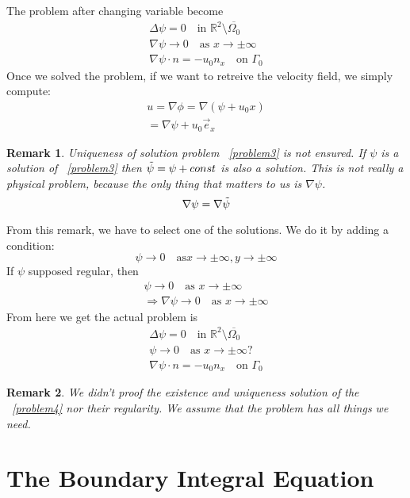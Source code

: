 \documentclass[a4paper,12pt]{article}
\newtheorem{remark}{Remark}
\begin{document}
The problem after changing variable become
\begin{align}  \label{problem3}
\Delta \psi=0 \quad \text{in } \mathbb{R}^2 \setminus \overline{\Omega_0}\\
\nabla\psi \to 0 \quad \text{as } x\to\pm\infty\\
\nabla\psi \cdot n = -u_0 n_x \quad \text{on } \Gamma_0 
\end{align}
Once we solved the problem, if we want to retreive the velocity field, we simply compute:
\begin{align}
 u=\nabla\phi=\nabla(\psi+u_0 x)\\
= \nabla\psi+u_0 \vec{e}_x
\end{align}
\begin{remark}
 Uniqueness of solution problem ~\eqref{problem3} is not ensured. If $\psi$ is a solution of ~\eqref{problem3} then
$\Tilde{\psi} = \psi+const$ is also a solution. This is not really a physical problem, because the only thing that
matters to us is $\nabla\psi$. 
\begin{equation}
 \nabla \psi=\nabla\Tilde{\psi}
\end{equation}
\end{remark}
From this remark, we have to select one of the solutions. We do it by adding a condition:
\begin{equation}
 \psi \to 0 \quad \text{as} x\to\pm\infty, y\to\pm\infty
\end{equation}
If $\psi$ supposed regular, then 
\begin{align}
 \psi\to0 \quad \text{as } x\to\pm\infty\\
\Rightarrow \nabla\psi\to0 \quad \text{as } x\to\pm\infty
\end{align}
From here we get the actual problem is
\begin{align}  \label{problem4}
\Delta \psi=0 \quad \text{in } \mathbb{R}^2 \setminus \overline{\Omega_0}\\
\psi \to 0 \quad \text{as } x\to\pm\infty ?\\
\nabla\psi \cdot n = -u_0 n_x \quad \text{on } \Gamma_0 
\end{align}

\begin{remark}
 We didn't proof the existence and uniqueness solution of the ~\eqref{problem4} nor their regularity. We assume that 
the problem has all things we need.
\end{remark}

\section{The Boundary Integral Equation}
\end{document}
